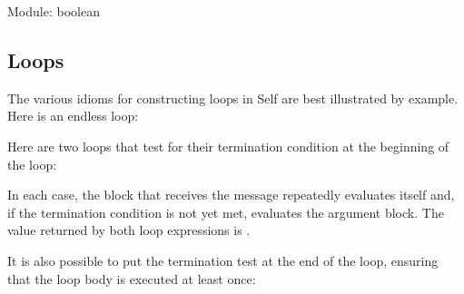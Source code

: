 \documentclass[letterpaper,10pt,english]{sphinxmanual}
\begin{document}
\begin{sphinxVerbatim}[commandchars=\\\{\}]
    \PYG{p}{[}   \PYG{p}{]}  \PYG{p}{[}
\end{sphinxVerbatim}

Module: boolean


\subsection{Loops}
\label{\detokenize{blocks:loops}}
The various idioms for constructing loops in Self are best illustrated by example.
Here is an endless loop:

\begin{sphinxVerbatim}[commandchars=\\\{\}]
\PYG{p}{[}  \PYG{p}{]} 
\end{sphinxVerbatim}

Here are two loops that test for their termination condition at the beginning of the loop:

\begin{sphinxVerbatim}[commandchars=\\\{\}]
\PYG{p}{[}  \PYG{p}{]}  \PYG{p}{[}  \PYG{p}{]}
\PYG{p}{[}  \PYG{p}{]}  \PYG{p}{[}  \PYG{p}{]}
\end{sphinxVerbatim}

In each case, the block that receives the message repeatedly evaluates itself and, if the termination
condition is not yet met, evaluates the argument block. The value returned by both loop expressions
is .

It is also possible to put the termination test at the end of the loop, ensuring that the loop body is
executed at least once:

\begin{sphinxVerbatim}[commandchars=\\\{\}]
\PYG{p}{[}  \PYG{p}{]}  \PYG{p}{[}  \PYG{p}{]}
\PYG{p}{[}  \PYG{p}{]}  \PYG{p}{[}  \PYG{p}{]}
\end{sphinxVerbatim}
\end{document}
